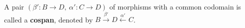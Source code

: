 \begin{definition}[Cospan]
    A pair \( (\beta' : B \to D,~\alpha' : C \to D) \) of morphisms with a common codomain is called a \textbf{cospan}, denoted by \( B \overset{\beta'}{\rightarrow} D \overset{\alpha'}{\leftarrow} C \). 
\end{definition} 